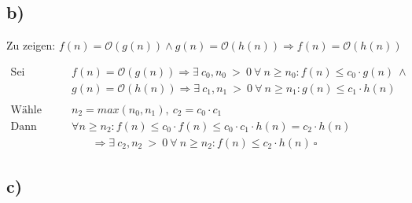 \documentclass[a4paper]{scrartcl}
\begin{document}
\subsection*{b)}

Zu zeigen: $f(n) = \mathcal{O}(g(n)) \wedge g(n) = \mathcal{O}(h(n)) \Rightarrow f(n) = \mathcal{O}(h(n))$

\begin{align*}
\text{Sei } &&& f(n) = \mathcal{O}(g(n)) \Rightarrow \exists ~ c_0 {,} n_0 ~ {>} ~ 0 ~ \forall ~ n \geq n_0 : f(n) \leq c_0 \cdot g(n) ~ \wedge \\ 
&&& g(n) = \mathcal{O}(h(n)) \Rightarrow \exists ~ c_1 {,} n_1 ~ {>} ~ 0 ~ \forall ~ n \geq n_1 : g(n) \leq c_1 \cdot h(n) \\ \\
\text{Wähle } &&& n_2 = max(n_0 {,} n_1) {,} ~ c_2 = c_0 \cdot c_1 \\
\text{Dann gilt } &&& \forall n \geq n_2 : f(n) \leq c_0 \cdot f(n) \leq c_0 \cdot c_1 \cdot h(n) = c_2 \cdot h(n)
\end{align*} 
\begin{align*}
\Rightarrow \exists ~ c_2 {,} n_2 ~ {>} ~ 0 ~ \forall ~ n \geq n_2 : f(n) \leq c_2 \cdot h(n) ~ \square
\end{align*}

\newpage

\subsection*{c)}
\end{document}
